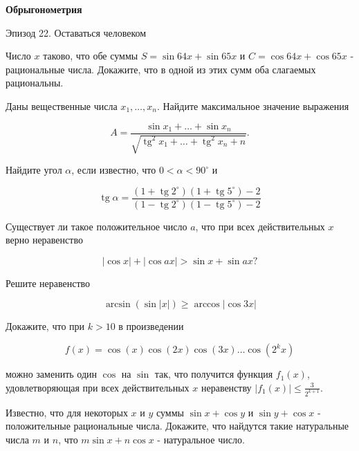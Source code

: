 \centerline{\bf \Huge Обрыгонометрия}

\begin{flushright}
        \scriptsize{Эпизод 22. Оставаться человеком}
\end{flushright}

Число $x$ таково, что обе суммы $S=\sin 64 x+\sin 65 x$ и $C=\cos 64 x+\cos 65 x$ - рациональные числа. Докажите, что в одной из этих сумм оба слагаемых рациональны.

Даны вещественные числа $x_1, \ldots, x_n$. Найдите максимальное значение выражения

$$
A=\frac{\sin x_1+\ldots+\sin x_n}{\sqrt{\operatorname{tg}^2 x_1+\ldots+\operatorname{tg}^2 x_n+n}} .
$$

Найдите угол $\alpha$, если известно, что $0<\alpha<90^{\circ}$ и

$$
\operatorname{tg} \alpha=\frac{\left(1+\operatorname{tg} 2^{\circ}\right)\left(1+\operatorname{tg} 5^{\circ}\right)-2}{\left(1-\operatorname{tg} 2^{\circ}\right)\left(1-\operatorname{tg} 5^{\circ}\right)-2}
$$

Существует ли такое положительное число $a$, что при всех действительных $x$ верно неравенство

$$
|\cos x|+|\cos a x|>\sin x+\sin a x ?
$$

Решите неравенство

$$
\arcsin (\sin |x|) \geqslant \arccos |\cos 3 x|
$$

Докажите, что при $k>10$ в произведении

$$
f(x)=\cos (x) \cos (2 x) \cos (3 x) \ldots \cos \left(2^k x\right)
$$


можно заменить один $\cos$ на $\sin$ так, что получится функция $f_1(x)$, удовлетворяющая при всех действительных $x$ неравенству $\left|f_1(x)\right| \leqslant \frac{3}{2^{k+1}}$.

Известно, что для некоторых $x$ и $y$ суммы $\sin x+\cos y$ и $\sin y+\cos x$ - положительные рациональные числа. Докажите, что найдутся такие натуральные числа $m$ и $n$, что $m \sin x+n \cos x$ - натуральное число.